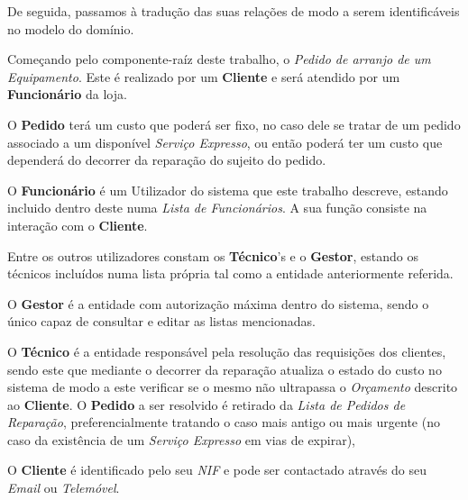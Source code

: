 \documentclass{article}
\begin{document}
\begin{table}[H]
\centering
{}
\end{table}
 De seguida, passamos à tradução das suas relações de modo a serem identificáveis no modelo do domínio.
 \par Começando pelo componente-raíz deste trabalho, o \textit{Pedido de arranjo de um Equipamento}. Este é realizado por um \textbf{Cliente} e será atendido por um \textbf{Funcionário} da loja.
 \par O \textbf{Pedido} terá um custo que poderá ser fixo, no caso dele se tratar de um pedido associado a um disponível \textit{Serviço Expresso}, ou então poderá ter um custo que dependerá do decorrer da reparação do sujeito do pedido.
 \par O \textbf{Funcionário} é um Utilizador do sistema que este trabalho descreve, estando incluido dentro deste numa \textit{Lista de Funcionários}. A sua função consiste na interação com o \textbf{Cliente}.
 \par Entre os outros utilizadores constam os \textbf{Técnico}'s e o \textbf{Gestor}, estando os técnicos incluídos numa lista própria tal como a entidade anteriormente referida.
 \par O \textbf{Gestor} é a entidade com autorização máxima dentro do sistema, sendo o único capaz de consultar e editar as listas mencionadas.
 \par O \textbf{Técnico} é a entidade responsável pela resolução das requisições dos clientes, sendo este que mediante o decorrer da reparação atualiza o estado do custo no sistema de modo a este verificar se o mesmo não ultrapassa o \textit{Orçamento} descrito ao \textbf{Cliente}. O \textbf{Pedido} a ser resolvido é retirado da \textit{Lista de Pedidos de Reparação}, preferencialmente tratando o caso mais antigo ou mais urgente (no caso da existência de um \textit{Serviço Expresso} em vias de expirar),
 \par O \textbf{Cliente} é identificado pelo seu \textit{NIF} e pode ser contactado através do seu \textit{Email} ou \textit{Telemóvel}.
 
\end{document}
